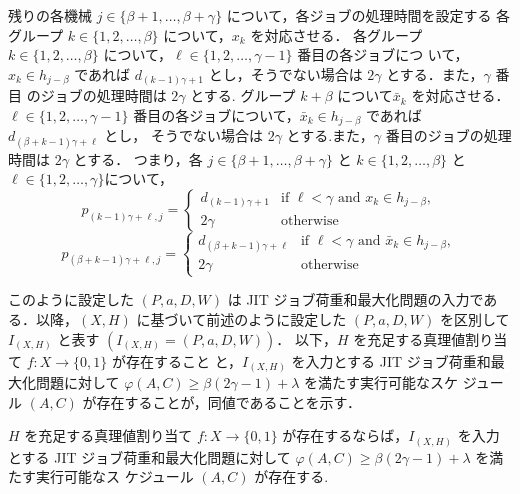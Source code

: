 \documentclass[12pt]{optlab-bachelor}
\begin{document}
\begin{description}
  残りの各機械 $j \in \{\beta + 1, \ldots , \beta + \gamma\}$ について，各ジョブの処理時間を設定する
  各グループ $k \in \{1,2,\ldots,\beta\}$ について，$x_k$ を対応させる．
  各グループ $k \in \{1,2,\ldots,\beta\}$ について，$\ell \in \{1,2,\ldots, \gamma - 1\}$ 番目の各ジョブにつ いて，$x_k \in h_{j - \beta}$ であれば $d_{(k - 1)\gamma + 1}$ とし，そうでない場合は $2\gamma$ とする．また，$\gamma$ 番目 のジョブの処理時間は $2\gamma$ とする.
  グループ $k + \beta$ について$\bar x_k$ を対応させる．
  $\ell \in \{1,2,\ldots, \gamma - 1\}$ 番目の各ジョブについて，$\bar x_k \in h_{j - \beta}$ であれば $d_{(\beta + k - 1)\gamma + \ell}$ とし， そうでない場合は $2\gamma$ とする.また，$\gamma$ 番目のジョブの処理時間は $2\gamma$ とする．
  つまり，各 $j \in \{\beta + 1,\ldots, \beta + \gamma\}$ と $k \in
  \{1,2,\ldots, \beta\}$ と $\ell \in \{1,2,\ldots, \gamma\}$について，
  \begin{displaymath}
    p_{(k - 1)\gamma + \ell, j} = \left\{ \begin{array}{ll} d_{(k - 1)\gamma + 1} & \text{if } \ell < \gamma \text{ and } x_k \in h_{j - \beta}, \\ 2\gamma & \text{otherwise} \end{array} \right.
  \end{displaymath}
  \begin{displaymath}
    p_{(\beta + k - 1)\gamma + \ell, j} = \left\{ \begin{array}{ll} d_{(\beta + k - 1)\gamma + \ell} & \text{if } \ell < \gamma \text{ and } \bar x_k \in h_{j - \beta}, \\ 2\gamma & \text{otherwise} \end{array} \right.
  \end{displaymath}
\end{description}

このように設定した $(P,a,D,W)$ は JIT ジョブ荷重和最大化問題の入力である．以降，$(X,H)$ に基づいて前述のように設定した $(P,a,D,W)$ を区別して $I_{(X,H)}$ と表す $(I_{(X,H)} = (P,a,D,W))$．
以下，$H$ を充足する真理値割り当て $f : X \to \{0,1\}$ が存在すること
と，$I_{(X,H)}$ を入力とする JIT ジョブ荷重和最大化問題に対して
$\varphi(A,C) \ge \beta(2\gamma - 1) + \lambda$ を満たす実行可能なスケ
ジュール $(A,C)$ が存在することが，同値であることを示す．

\begin{lemma}\label{l_1}
  $H$ を充足する真理値割り当て $f : X \to \{0,1\}$ が存在するならば，$I_{(X,H)}$ を入力とする JIT ジョブ荷重和最大化問題に対して
  $\varphi(A, C) \ge \beta(2\gamma - 1) + \lambda$ を満たす実行可能なス
  ケジュール $(A, C)$ が存在する.
\end{lemma}
\end{document}

